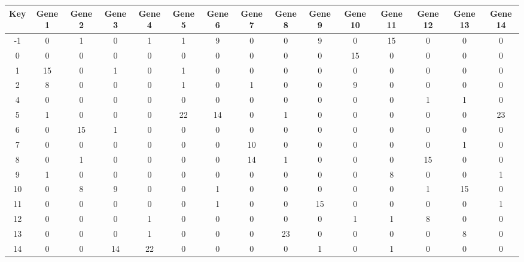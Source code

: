 \begin{tabular}{|c|c|c|c|c|c|c|c|c|c|c|c|c|c|c|}
\hline
Key & Gene 1 & Gene 2 & Gene 3 & Gene 4 & Gene 5 & Gene 6 & Gene 7 & Gene 8 & Gene 9 & Gene 10 & Gene 11 & Gene 12 & Gene 13 & Gene 14 \\
\hline
-1 & 0 & 1 & 0 & 1 & 1 & 9 & 0 & 0 & 9 & 0 & 15 & 0 & 0 & 0 \\
0 & 0 & 0 & 0 & 0 & 0 & 0 & 0 & 0 & 0 & 15 & 0 & 0 & 0 & 0 \\
1 & 15 & 0 & 1 & 0 & 1 & 0 & 0 & 0 & 0 & 0 & 0 & 0 & 0 & 0 \\
2 & 8 & 0 & 0 & 0 & 1 & 0 & 1 & 0 & 0 & 9 & 0 & 0 & 0 & 0 \\
4 & 0 & 0 & 0 & 0 & 0 & 0 & 0 & 0 & 0 & 0 & 0 & 1 & 1 & 0 \\
5 & 1 & 0 & 0 & 0 & 22 & 14 & 0 & 1 & 0 & 0 & 0 & 0 & 0 & 23 \\
6 & 0 & 15 & 1 & 0 & 0 & 0 & 0 & 0 & 0 & 0 & 0 & 0 & 0 & 0 \\
7 & 0 & 0 & 0 & 0 & 0 & 0 & 10 & 0 & 0 & 0 & 0 & 0 & 1 & 0 \\
8 & 0 & 1 & 0 & 0 & 0 & 0 & 14 & 1 & 0 & 0 & 0 & 15 & 0 & 0 \\
9 & 1 & 0 & 0 & 0 & 0 & 0 & 0 & 0 & 0 & 0 & 8 & 0 & 0 & 1 \\
10 & 0 & 8 & 9 & 0 & 0 & 1 & 0 & 0 & 0 & 0 & 0 & 1 & 15 & 0 \\
11 & 0 & 0 & 0 & 0 & 0 & 1 & 0 & 0 & 15 & 0 & 0 & 0 & 0 & 1 \\
12 & 0 & 0 & 0 & 1 & 0 & 0 & 0 & 0 & 0 & 1 & 1 & 8 & 0 & 0 \\
13 & 0 & 0 & 0 & 1 & 0 & 0 & 0 & 23 & 0 & 0 & 0 & 0 & 8 & 0 \\
14 & 0 & 0 & 14 & 22 & 0 & 0 & 0 & 0 & 1 & 0 & 1 & 0 & 0 & 0 \\
\hline
\end{tabular}